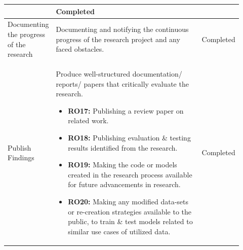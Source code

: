 \begin{longtable}{| p{0.135\linewidth} | p{0.63\linewidth}| p{0.15\linewidth}|}
\begin{itemize}
\end{itemize}
&
Completed\\
\hline
Documenting the progress of the research & Documenting and notifying the continuous progress of the research project and any faced obstacles. 
&
Completed\\
\hline
Publish Findings & Produce well-structured documentation/ reports/ papers that critically evaluate the research.
\begin{itemize}
\item \textbf{RO17:} Publishing a review paper on related work.
\item \textbf{RO18:} Publishing evaluation \& testing results identified from the research.
\item \textbf{RO19:} Making the code or models created in the research process available for future advancements in research.
\item \textbf{RO20:} Making any modified data-sets or re-creation strategies available to the public, to train \& test models related to similar use cases of utilized data.
\vspace{-7mm}       %
\end{itemize}
&
Completed\\
\hline
\end{longtable}